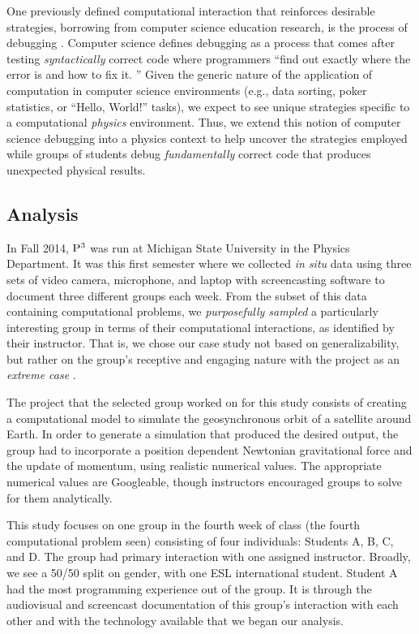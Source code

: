 \documentclass{msuphddissertation}
\begin{document}
\begin{doublespace}
One previously defined computational interaction that reinforces desirable strategies, borrowing from computer science education research, is the process of debugging \cite{Fitzgerald2008}.  Computer science defines debugging as a process that comes after testing \emph{syntactically} correct code where programmers ``find out exactly where the error is and how to fix it. \cite{McCauley2008}''  Given the generic nature of the application of computation in computer science environments (e.g., data sorting, poker statistics, or ``Hello, World!'' tasks), we expect to see unique strategies specific to a computational \emph{physics} environment.  Thus, we extend this notion of computer science debugging into a physics context to help uncover the strategies employed while groups of students debug \emph{fundamentally} correct code that produces unexpected physical results.

\subsection{Analysis}

In Fall 2014, ${\rm P}^{3}$ was run at Michigan State University in the Physics Department.  It was this first semester where we collected \emph{in situ} data using three sets of video camera, microphone, and laptop with screencasting software to document three different groups each week.  From the subset of this data containing computational problems, we \emph{purposefully sampled} a particularly interesting group in terms of their computational interactions, as identified by their instructor.  That is, we chose our case study not based on generalizability, but rather on the group's receptive and engaging nature with the project as an \emph{extreme case} \cite{Flyvbjerg2006}.

The project that the selected group worked on for this study consists of creating a computational model to simulate the geosynchronous orbit of a satellite around Earth.  In order to generate a simulation that produced the desired output, the group had to incorporate a position dependent Newtonian gravitational force and the update of momentum, using realistic numerical values.  The appropriate numerical values are Googleable, though instructors encouraged groups to solve for them analytically.

This study focuses on one group in the fourth week of class (the fourth computational problem seen) consisting of four individuals: Students A, B, C, and D.  The group had primary interaction with one assigned instructor.  Broadly, we see a 50/50 split on gender, with one ESL international student.  Student A had the most programming experience out of the group.  It is through the audiovisual and screencast documentation of this group's interaction with each other and with the technology available that we began our analysis.


\end{doublespace}
\end{document}
